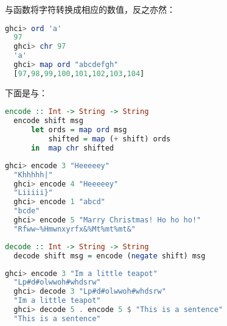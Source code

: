 \documentclass[./main.tex]{subfiles}
\begin{document}
与函数将字符转换成相应的数值，反之亦然：

\begin{lstlisting}[language=Haskell]
  ghci> ord 'a'
  97
  ghci> chr 97
  'a'
  ghci> map ord "abcdefgh"
  [97,98,99,100,101,102,103,104]
\end{lstlisting}

下面是与：

\begin{lstlisting}[language=Haskell]
  encode :: Int -> String -> String
  encode shift msg
      let ords = map ord msg
          shifted = map (+ shift) ords
      in  map chr shifted
\end{lstlisting}

\begin{lstlisting}[language=Haskell]
  ghci> encode 3 "Heeeeey"
  "Khhhhh|"
  ghci> encode 4 "Heeeeey"
  "Liiiii}"
  ghci> encode 1 "abcd"
  "bcde"
  ghci> encode 5 "Marry Christmas! Ho ho ho!"
  "Rfww~%Hmwnxyrfx&%Mt%mt%mt&"
\end{lstlisting}

\begin{lstlisting}[language=Haskell]
  decode :: Int -> String -> String
  decode shift msg = encode (negate shift) msg
\end{lstlisting}

\begin{lstlisting}[language=Haskell]
  ghci> encode 3 "Im a little teapot"
  "Lp#d#olwwoh#whdsrw"
  ghci> decode 3 "Lp#d#olwwoh#whdsrw"
  "Im a little teapot"
  ghci> decode 5 . encode 5 $ "This is a sentence"
  "This is a sentence"
\end{lstlisting}

\end{document}
